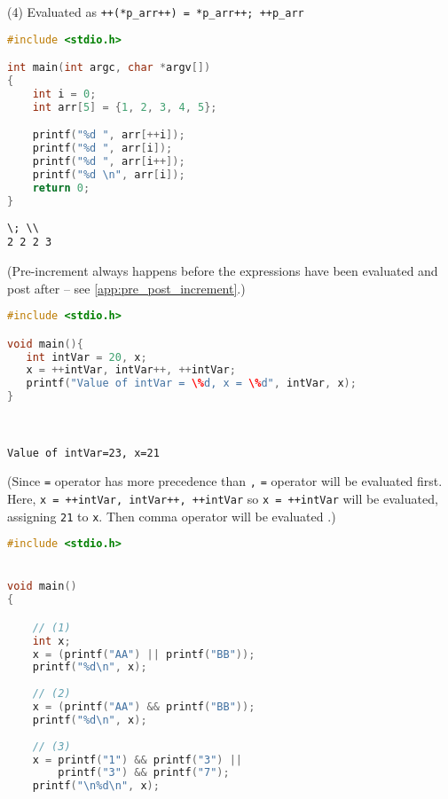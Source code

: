 \documentclass[a4paper]{article}
\begin{document}
\begin{exmp}
\begin{multicols}{2}
(4) Evaluated as \texttt{++(*p\_arr++) = *p\_arr++; ++p\_arr}
\end{multicols}

\clearpage
\begin{multicols}{2}
\begin{lstlisting}[language=c]
#include <stdio.h>

int main(int argc, char *argv[])
{
	int i = 0;
	int arr[5] = {1, 2, 3, 4, 5};

	printf("%d ", arr[++i]);
	printf("%d ", arr[i]);
	printf("%d ", arr[i++]);
	printf("%d \n", arr[i]);
	return 0;
}
\end{lstlisting}
\columnbreak
\begin{verbatim}
\; \\
2 2 2 3
\end{verbatim}
(Pre-increment always happens before the expressions have been evaluated and post after -- see \ref{app:pre_post_increment}.)
\end{multicols}


\begin{multicols}{2}
\begin{lstlisting}[language=c]
#include <stdio.h>

void main(){
   int intVar = 20, x;
   x = ++intVar, intVar++, ++intVar;
   printf("Value of intVar = \%d, x = \%d", intVar, x);
}
\end{lstlisting}
\columnbreak
\; \\
\begin{verbatim}
Value of intVar=23, x=21   
\end{verbatim}
(Since \texttt{=} operator has more precedence than \texttt{,} \texttt{=} operator will be evaluated first.
Here, \texttt{x = ++intVar, intVar++, ++intVar} so
\texttt{x = ++intVar} will be evaluated, assigning \texttt{21} to \texttt{x}. Then comma operator will be evaluated \cite{aptitudequestions}.)
\end{multicols}


\begin{multicols}{2}
\begin{lstlisting}[language=c]
#include <stdio.h>


void main()
{

	// (1)
	int x;
	x = (printf("AA") || printf("BB"));
	printf("%d\n", x);
	
	// (2)
	x = (printf("AA") && printf("BB"));
	printf("%d\n", x);
	
	// (3)
	x = printf("1") && printf("3") || 
		printf("3") && printf("7");
	printf("\n%d\n", x);
	

\end{lstlisting}
\end{multicols}
\end{exmp}
\end{document}
